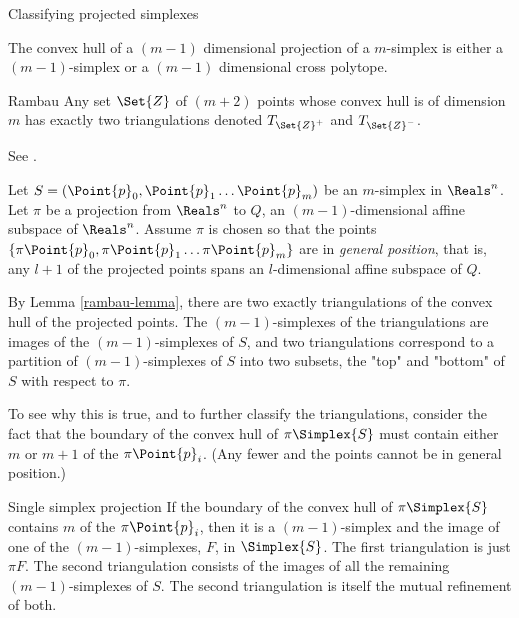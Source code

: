 \begin{plSection}{Classifying projected simplexes}
\label{sec:classifying}


The convex hull of a $(m-1)$ dimensional projection of a $m$-simplex
is either a $(m-1)$-simplex or a $(m-1)$ dimensional cross polytope.

\begin{plLemma}{Rambau}{}
\label{rambau-lemma}
Any set $\Set{Z}$ of $(m+2)$ points whose convex hull is of dimension $m$
has exactly two triangulations denoted $T_{\Set{Z}^+}$ and $T_{\Set{Z}^-}$.
\end{plLemma}

See .

Let $S=(\Point{p}_0, \Point{p}_1 \ldots  \Point{p}_m)$ be an $m$-simplex in $\Reals^{n}$.
Let $\pi$ be a projection from $\Reals^{n}$ to $Q$, an $(m-1)$-dimensional
affine subspace of $\Reals^{n}$.
Assume $\pi$ is chosen so that the points
$\left\{\pi \Point{p}_0, \pi \Point{p}_1 \ldots  \pi \Point{p}_m\right\}$ are in {\it general position},
that is, any $l+1$ of the projected points spans an $l$-dimensional
affine subspace of $Q$.

By Lemma \ref{rambau-lemma},
there are two exactly triangulations of the convex hull of the projected points.
The $(m-1)$-simplexes of the triangulations are images of the $(m-1)$-simplexes of $S$,
and two triangulations correspond to a partition of $(m-1)$-simplexes of $S$
into two subsets, the "top" and "bottom" of $S$ with respect to $\pi$.

To see why this is true, and to further classify the triangulations,
consider the fact that the boundary of the convex hull of $\pi \Simplex{S}$
must contain either $m$ or $m+1$ of the $\pi \Point{p}_i$.
(Any fewer and the points cannot be in general position.)

\begin{plTheorem}{Single simplex projection}{}
\label{one-simplex-case}
If the boundary of the convex hull of $\pi \Simplex{S}$
contains $m$ of the $\pi \Point{p}_i$,
then it is a $(m-1)$-simplex
and the image of one of the $(m-1)$-simplexes, $F$, in $\Simplex{S}$.
The first triangulation is just $\pi F$.
The second triangulation consists of the images of
all the remaining $(m-1)$-simplexes of $S$.
The second triangulation is itself the mutual refinement of both.
\end{plTheorem}


\end{plSection}
